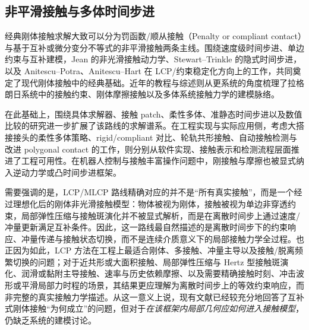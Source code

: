 \subsection{非平滑接触与多体时间步进}
经典刚体接触求解大致可以分为罚函数/顺从接触（Penalty or compliant contact）与基于互补或微分变分不等式的非平滑接触两条主线。围绕速度级时间步进、单边约束与互补建模，Jean 的非光滑接触动力学、Stewart--Trinkle 的隐式时间步进，以及 Anitescu--Potra、Anitescu--Hart 在 LCP/约束稳定化方向上的工作，共同奠定了现代刚体接触中的经典基础\cite{jean1999nonsmooth,stewart1996implicit,anitescu1997formulating,anitescu2004constraint,anitescu2010iterative,tasora2011matrixfree,pfeiffer2012nonsmooth}。近年的教程与综述则从更系统的角度梳理了拉格朗日系统中的接触约束、刚体摩擦接触以及多体系统接触力学的建模脉络\cite{contacttutorial2016,contactconstraints2016,flores2022contact,wang2021nonsmooth,peng2022sensitivity}。

在此基础上，围绕具体求解器、接触 patch、柔性多体、准静态时间步进以及数值比较的研究进一步扩展了该路线的求解谱系\cite{melanz2017comparison,catchingup2018,contactpatch2018,symplecticcontact2019,flexiblecontact2020,convexquasistatic2021,effectivemass2022,contactbasics2023,predictioncorrection2025,contactmultiscale2025}。在工程实现与实际应用侧，考虑大搭接接头的柔性多体策略、rigid/compliant 对比、轮轨共形接触、自动接触检测与改进 polygonal contact 的工作，则分别从软件实现、接触表示和检测流程层面推进了工程可用性\cite{lapjoints2016,pazouki2017compliant,conformalwheel2020,autocontact2023,polygonalcontact2023,nencioni2025conformal,gradientcontact2025}。在机器人控制与接触丰富操作问题中，刚接触与摩擦也被显式纳入逆动力学或凸时间步进框架\cite{inversedynamics2016,convexquasistatic2021}。

需要强调的是，LCP/MLCP 路线精确对应的并不是“所有真实接触”，而是一个经过理想化后的刚体非光滑接触模型：物体被视为刚体，接触被视为单边非穿透约束，局部弹性压缩与接触斑演化并不被显式解析，而是在离散时间步上通过速度/冲量更新满足互补条件\cite{jean1999nonsmooth,stewart1996implicit,anitescu1997formulating,contacttutorial2016,flores2022contact,wang2021nonsmooth}。因此，这一路线最自然描述的是离散时间步下的约束响应、冲量传递与接触状态切换，而不是连续介质意义下的局部接触力学全过程。也正因为如此，LCP 方法在工程上最适合刚体、多接触、冲量主导以及接触/脱离频繁切换的问题；对于近共形或大面积接触、局部弹性压缩与 Hertz 型接触斑演化、润滑或黏附主导接触、速率与历史依赖摩擦、以及需要精确接触时刻、冲击波形或平滑局部力时程的场景，其结果更应理解为离散时间步上的等效约束响应，而非完整的真实接触力学描述\cite{pazouki2017compliant,contactpatch2018,nencioni2025conformal}。从这一意义上说，现有文献已经较充分地回答了互补式刚体接触“为何成立”的问题，但对于\emph{在该框架内局部几何应如何进入接触模型}，仍缺乏系统的建模讨论。

